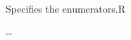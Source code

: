 

\begin{XcodeMLChildElements}
{Specifies the enumerators.}{R}
\end{XcodeMLChildElements}

\begin{XcodeMLAttributes}
\XcodeMLAttrDef{-}{-}
{-}{-}
\end{XcodeMLAttributes}
